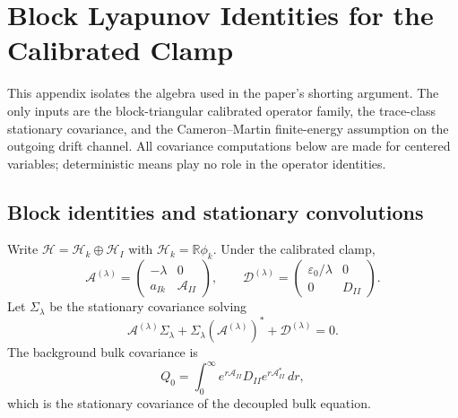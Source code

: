 \section{Block Lyapunov Identities for the Calibrated Clamp}
\label{app:block_identities}

This appendix isolates the algebra used in the paper's shorting argument.  The
only inputs are the block-triangular calibrated operator family, the trace-class
stationary covariance, and the Cameron--Martin finite-energy assumption on the
outgoing drift channel.  All covariance computations below are made for centered
variables; deterministic means play no role in the operator identities.

\subsection{Block identities and stationary convolutions}

Write $\mathcal{H}=\mathcal{H}_k\oplus\mathcal{H}_I$ with
$\mathcal{H}_k=\mathbb{R}\phi_k$.  Under the calibrated clamp,
\begin{equation}
 \mathcal{A}^{(\lambda)}=
 \begin{pmatrix}-\lambda&0\\a_{Ik}&\mathcal{A}_{II}\end{pmatrix},
 \qquad
 \mathcal{D}^{(\lambda)}=
 \begin{pmatrix}\varepsilon_0/\lambda&0\\0&D_{II}\end{pmatrix}.
 \label{eq:exact_blocks}
\end{equation}
Let $\Sigma_\lambda$ be the stationary covariance solving
\[
  \mathcal{A}^{(\lambda)}\Sigma_\lambda
  +\Sigma_\lambda(\mathcal{A}^{(\lambda)})^*
  +\mathcal{D}^{(\lambda)}=0.
\]
The background bulk covariance is
\begin{equation}
  Q_0
  =
  \int_0^\infty e^{r\mathcal{A}_{II}}D_{II}e^{r\mathcal{A}_{II}^*}\,dr,
  \label{eq:Q0_convolution}
\end{equation}
which is the stationary covariance of the decoupled bulk equation.

